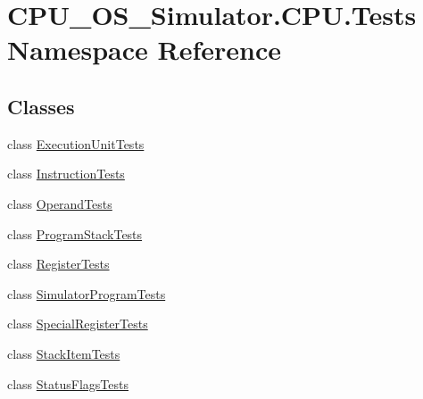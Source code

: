 \hypertarget{namespace_c_p_u___o_s___simulator_1_1_c_p_u_1_1_tests}{}\section{C\+P\+U\+\_\+\+O\+S\+\_\+\+Simulator.\+C\+P\+U.\+Tests Namespace Reference}
\label{namespace_c_p_u___o_s___simulator_1_1_c_p_u_1_1_tests}
\subsection*{Classes}
\begin{DoxyCompactItemize}
\item 
class \hyperlink{class_c_p_u___o_s___simulator_1_1_c_p_u_1_1_tests_1_1_execution_unit_tests}{Execution\+Unit\+Tests}
\item 
class \hyperlink{class_c_p_u___o_s___simulator_1_1_c_p_u_1_1_tests_1_1_instruction_tests}{Instruction\+Tests}
\item 
class \hyperlink{class_c_p_u___o_s___simulator_1_1_c_p_u_1_1_tests_1_1_operand_tests}{Operand\+Tests}
\item 
class \hyperlink{class_c_p_u___o_s___simulator_1_1_c_p_u_1_1_tests_1_1_program_stack_tests}{Program\+Stack\+Tests}
\item 
class \hyperlink{class_c_p_u___o_s___simulator_1_1_c_p_u_1_1_tests_1_1_register_tests}{Register\+Tests}
\item 
class \hyperlink{class_c_p_u___o_s___simulator_1_1_c_p_u_1_1_tests_1_1_simulator_program_tests}{Simulator\+Program\+Tests}
\item 
class \hyperlink{class_c_p_u___o_s___simulator_1_1_c_p_u_1_1_tests_1_1_special_register_tests}{Special\+Register\+Tests}
\item 
class \hyperlink{class_c_p_u___o_s___simulator_1_1_c_p_u_1_1_tests_1_1_stack_item_tests}{Stack\+Item\+Tests}
\item 
class \hyperlink{class_c_p_u___o_s___simulator_1_1_c_p_u_1_1_tests_1_1_status_flags_tests}{Status\+Flags\+Tests}
\end{DoxyCompactItemize}
